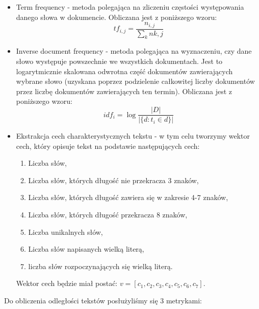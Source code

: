 \documentclass{classrep}
\begin{document}
\begin{itemize}

\item Term frequency - metoda polegająca na zliczeniu częstości występowania danego słowa w dokumencie. Obliczana jest z poniższego wzoru:
$$
tf_{i,j}
= \frac{n_{i,j}}{\sum_{k}n{k,j}}
$$

\item Inverse document frequency - metoda polegająca na wyznaczeniu, czy dane słowo występuje powszechnie we wszystkich dokumentach. Jest to logarytmicznie skalowana odwrotna część dokumentów zawierających wybrane słowo (uzyskana poprzez podzielenie całkowitej liczby dokumentów przez liczbę dokumentów zawierających ten termin). Obliczana jest z poniższego wzoru:
$$
idf_{i}
= \log\frac{|D|}{|\{d : t_{i} \in d\}|}
$$

\item Ekstrakcja cech charakterystycznych tekstu - w tym celu tworzymy wektor cech, który opisuje tekst na podstawie następujących cech:
\begin{enumerate}
	\item Liczba słów,
	\item Liczba słów, których długość nie przekracza 3 znaków,
	\item Liczba słów, których długość zawiera się w zakresie 4-7 znaków,
	\item Liczba słów, których długość przekracza 8 znaków,
	\item Liczba unikalnych słów,
	\item Liczba słów napisanych wielką literą,
	\item liczba słów rozpoczynających się wielką literą. 
\end{enumerate}
Wektor cech będzie miał postać:
$ v = [c_{1}, c_{2}, c_{3}, c_{4}, c_{5}, c_{6}, c_{7}] $.
\newline
\end{itemize}

Do obliczenia odległości tekstów posłużyliśmy się 3 metrykami: \newline
\end{document}
